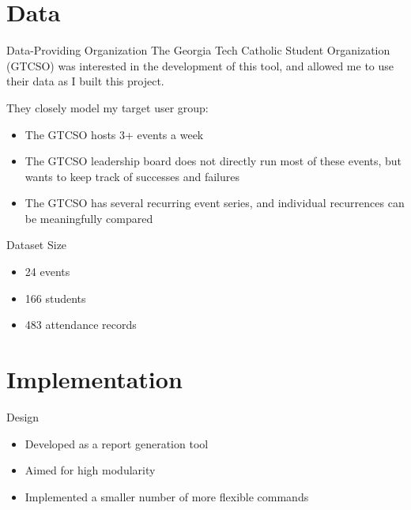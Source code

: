 \documentclass{beamer}
\begin{document}
\section{Data}

\begin{frame}{Data-Providing Organization}
    The Georgia Tech Catholic Student Organization (GTCSO) was interested in the development of this tool,
    and allowed me to use their data as I built this project. 

    They closely model my target user group:
    \begin{itemize}
        \item The GTCSO hosts 3+ events a week
        \item The GTCSO leadership board does not directly run most of these events,
            but wants to keep track of successes and failures
        \item The GTCSO has several recurring event series, and individual recurrences
            can be meaningfully compared
    \end{itemize}
\end{frame}

\begin{frame}{Dataset Size}
    \begin{itemize}
        \item 24 events
        \item 166 students
        \item 483 attendance records
    \end{itemize}


\end{frame}

\section{Implementation}

\begin{frame}{Design}
    \begin{itemize}
        \item Developed as a report generation tool
        \item Aimed for high modularity
        \item Implemented a smaller number of more flexible commands
    \end{itemize}
\end{frame}
\end{document}
